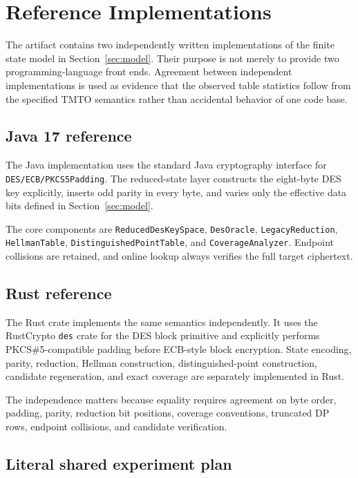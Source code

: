 \section{Reference Implementations}
\label{sec:implementation}

The artifact contains two independently written implementations of the finite
state model in Section~\ref{sec:model}. Their purpose is not merely to provide
two programming-language front ends. Agreement between independent
implementations is used as evidence that the observed table statistics follow
from the specified TMTO semantics rather than accidental behavior of one code
base.

\subsection{Java 17 reference}

The Java implementation uses the standard Java cryptography interface for
\texttt{DES/ECB/PKCS5Padding}. The reduced-state layer constructs the
eight-byte DES key explicitly, inserts odd parity in every byte, and varies
only the effective data bits defined in Section~\ref{sec:model}.

The core components are \texttt{ReducedDesKeySpace}, \texttt{DesOracle},
\texttt{LegacyReduction}, \texttt{HellmanTable},
\texttt{DistinguishedPointTable}, and \texttt{CoverageAnalyzer}. Endpoint
collisions are retained, and online lookup always verifies the full target
ciphertext.

\subsection{Rust reference}

The Rust crate implements the same semantics independently. It uses the
RustCrypto \texttt{des} crate for the DES block primitive and explicitly
performs PKCS\#5-compatible padding before ECB-style block encryption. State
encoding, parity, reduction, Hellman construction, distinguished-point
construction, candidate regeneration, and exact coverage are separately
implemented in Rust.

The independence matters because equality requires agreement on byte order,
padding, parity, reduction bit positions, coverage conventions, truncated DP
rows, endpoint collisions, and candidate verification.

\subsection{Literal shared experiment plan}

